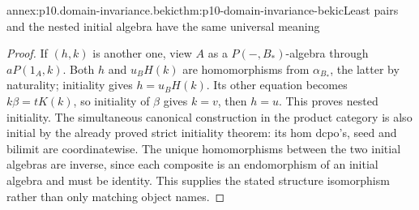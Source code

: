 \begin{annexitem}{annex:p10.domain-invariance.bekic}{thm:p10-domain-invariance-bekic}{Least pairs and the nested initial algebra have the same universal meaning}
\begin{proof}
If \((h,k)\) is another one, view \(A\) as a
\(P(-,B_*)\)-algebra through \(aP(1_A,k)\).
Both \(h\) and \(u_BH(k)\) are homomorphisms from
\(\alpha_{B_*}\), the latter by naturality; initiality gives
\(h=u_BH(k)\). Its other equation becomes
\(k\beta=tK(k)\), so initiality of \(\beta\) gives
\(k=v\), then \(h=u\). This proves nested initiality.
The simultaneous canonical construction in the product category
is also initial by the already proved strict initiality theorem:
its hom dcpo's, seed and bilimit are coordinatewise. The unique
homomorphisms between the two initial algebras are inverse,
since each composite is an endomorphism of an initial algebra
and must be identity. This supplies the stated structure
isomorphism rather than only matching object names.
\end{proof}
\end{annexitem}

